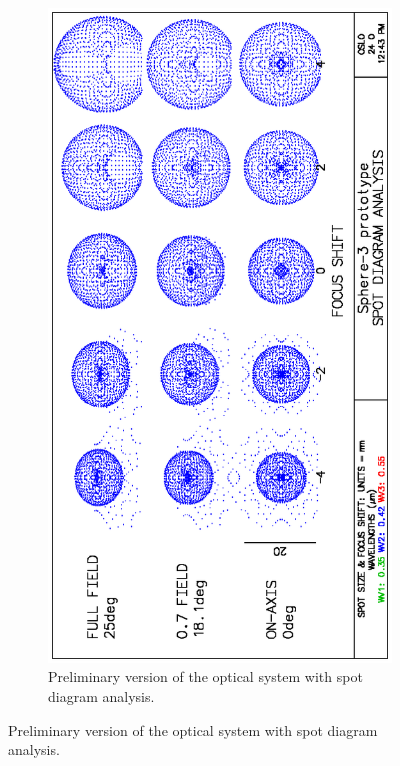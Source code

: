 \documentclass[a4paper]{jpconf}
\begin{document}
\begin{figure}[t]
\begin{subfigure}[b]{0.53\textwidth}
    \includegraphics[height=.37\textheight, angle=-90]{Sphere3spot.eps}
    \caption{Preliminary version of the optical system with spot diagram analysis.}
    \label{fig:lightspots}
\end{subfigure}
\end{figure}
\end{document}
